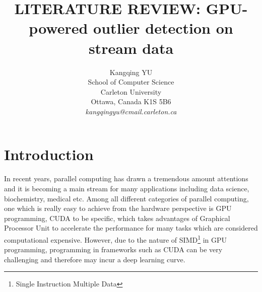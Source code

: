 \documentclass[11pt]{article}       %
\begin{document}


\title{LITERATURE REVIEW: GPU-powered outlier detection on stream data}


\author{
Kangqing YU\\
School of Computer Science\\
Carleton University\\
Ottawa, Canada K1S 5B6\\
{\em kangqingyu@cmail.carleton.ca}
} %

\maketitle



\section{Introduction} \label{intro}

In recent years, parallel computing has drawn a tremendous amount attentions and it is becoming a main stream for many applications including data science, biochemistry, medical etc. Among all different categories of parallel computing, one which is really easy to achieve from the hardware perspective is GPU programming, CUDA to be specific, which takes advantages of Graphical Processor Unit to accelerate the performance for many tasks which are considered computational expensive. However, due to the nature of SIMD\footnote{Single Instruction Multiple Data} in GPU programming, programming in frameworks such as CUDA can be very challenging and therefore may incur a deep learning curve. 
\end{document}
